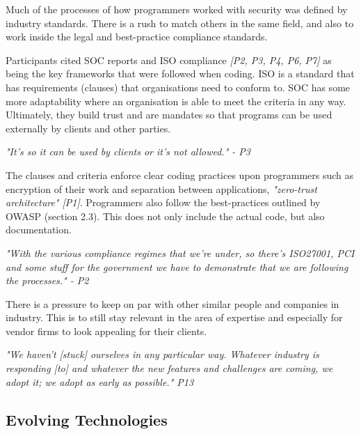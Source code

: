 \par Much of the processes of how programmers worked with security was defined by industry standards. There is a rush to match others in the same field, and also to work inside the legal and best-practice compliance standards. 
\newline
\par 
Participants cited SOC reports and ISO \cite{iso} compliance \textit{[P2, P3, P4, P6, P7]} as being the key frameworks that were followed when coding. ISO is a standard that has requirements (clauses) that organisations need to conform to. SOC has some more adaptability where an organisation is able to meet the criteria in any way. Ultimately, they build trust and are mandates so that programs can be used externally by clients and other parties. 
\newline
\par
\textit{"It's so it can be used by clients or it's not allowed." - P3}
\newline
\par
The clauses and criteria enforce clear coding practices upon programmers such as encryption of their work and separation between applications, \textit{"zero-trust architecture" [P1]}. Programmers also follow the best-practices outlined by OWASP (section 2.3). This does not only include the actual code, but also documentation. 
\newline
\par
\textit{"With the various compliance regimes that we're under, so there's ISO27001, PCI and some stuff for the government we have to demonstrate that we are following the processes." - P2}
\newline
\par
There is a pressure to keep on par with other similar people and companies in industry. This is to still stay relevant in the area of expertise and especially for vendor firms to look appealing for their clients. 
\newline
\par
\textit{"We haven't [stuck] ourselves in any particular way. Whatever industry is responding [to] and whatever the new features and challenges are coming, we adopt it; we adopt as early as possible." P13}

\subsection{Evolving Technologies}


